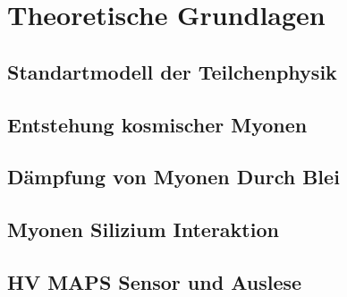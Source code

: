 \section{Theoretische Grundlagen} 

\subsection{Standartmodell der Teilchenphysik}



\subsection{Entstehung kosmischer Myonen}



\subsection{Dämpfung von Myonen Durch Blei}



\subsection{Myonen Silizium Interaktion}



\subsection{HV MAPS Sensor und Auslese}